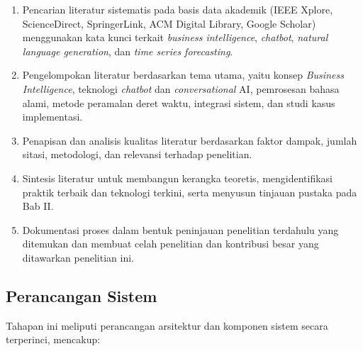 \begin{enumerate}[label=\alph*.]
  \item Pencarian literatur sistematis pada basis data akademik (IEEE Xplore, ScienceDirect, SpringerLink, ACM Digital Library, Google Scholar) menggunakan kata kunci terkait \textit{business intelligence}, \textit{chatbot}, \textit{natural language generation}, dan \textit{time series forecasting}. 
  
  \item Pengelompokan literatur berdasarkan tema utama, yaitu konsep \textit{Business Intelligence}, teknologi \textit{chatbot} dan \textit{conversational} AI, pemrosesan bahasa alami, metode peramalan deret waktu, integrasi sistem, dan studi kasus implementasi.
  
  \item Penapisan dan analisis kualitas literatur berdasarkan faktor dampak, jumlah sitasi, metodologi, dan relevansi terhadap penelitian.
  
  \item Sintesis literatur untuk membangun kerangka teoretis, mengidentifikasi praktik terbaik dan teknologi terkini, serta menyusun tinjauan pustaka pada Bab II.
  
  \item Dokumentasi proses dalam bentuk peninjauan penelitian terdahulu yang ditemukan dan membuat celah penelitian dan kontribusi besar yang ditawarkan penelitian ini.
\end{enumerate}

\subsection{Perancangan Sistem}

Tahapan ini meliputi perancangan arsitektur dan komponen sistem secara terperinci, mencakup:

